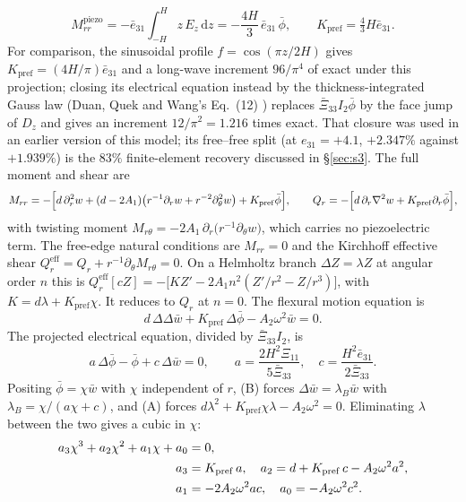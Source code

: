 \documentclass[11pt]{article}
\newcommand{\eebar}{\bar{e}_{31}}
\newcommand{\Xibar}{\bar{\Xi}_{33}}
\begin{document}
\begin{equation}
M_{rr}^{\mathrm{piezo}}=-\eebar\!\int_{-H}^{H}\!z\,E_z\,\mathrm dz
=-\frac{4H}{3}\,\eebar\,\bar\phi,\qquad
K_{\mathrm{pref}}=\tfrac43H\eebar.
\end{equation}
For comparison, the sinusoidal profile $f=\cos(\pi z/2H)$ gives
$K_{\mathrm{pref}}=(4H/\pi)\eebar$ and a long-wave increment $96/\pi^4$ of
exact under this projection; closing its electrical equation instead by
the thickness-integrated Gauss law (Duan, Quek and Wang's Eq.~(12)
\cite{duan2005}) replaces $\Xibar I_2\bar\phi$ by the face jump of
$D_z$ and gives an increment $12/\pi^2=1.216$ times exact. That closure
was used in an earlier version of this model; its free--free split
(at $e_{31}=+4.1$, $+2.347\%$ against $+1.939\%$) is the $83\%$
finite-element recovery discussed in \S\ref{sec:s3}. The full moment and shear are
\begin{equation}
M_{rr}=-\Bigl[d\,\partial_r^2 w+(d-2A_1)\bigl(r^{-1}\partial_r w
+r^{-2}\partial_\theta^2 w\bigr)+K_{\mathrm{pref}}\bar\phi\Bigr],\qquad
Q_r=-\Bigl[d\,\partial_r\nabla^2 w+K_{\mathrm{pref}}\partial_r\bar\phi\Bigr],
\end{equation}
with twisting moment $M_{r\theta}=-2A_1\,\partial_r\bigl(r^{-1}\partial_\theta w\bigr)$,
which carries no piezoelectric term. The free-edge natural conditions are
$M_{rr}=0$ and the Kirchhoff effective shear
$Q_r^{\mathrm{eff}}=Q_r+r^{-1}\partial_\theta M_{r\theta}=0$. On a Helmholtz branch
$\Delta Z=\lambda Z$ at angular order $n$ this is
$Q_r^{\mathrm{eff}}[cZ]=-\bigl[KZ'-2A_1n^2(Z'/r^2-Z/r^3)\bigr]$, with
$K=d\lambda+K_{\mathrm{pref}}\chi$. It reduces to $Q_r$ at $n=0$.
The flexural motion equation is
\begin{equation}
d\,\Delta\Delta\bar w+K_{\mathrm{pref}}\,\Delta\bar\phi
-A_2\omega^2\bar w=0. \tag{A}
\end{equation}
The projected electrical equation, divided by $\Xibar I_2$, is
\begin{equation}
a\,\Delta\bar\phi-\bar\phi+c\,\Delta\bar w=0,\qquad
a=\frac{2H^2\Xi_{11}}{5\Xibar},\quad c=\frac{H^2\eebar}{2\Xibar}. \tag{B}
\end{equation}
Positing $\bar\phi=\chi\bar w$ with $\chi$ independent of $r$, (B) forces
$\Delta\bar w=\lambda_B\bar w$ with $\lambda_B=\chi/(a\chi+c)$, and (A)
forces $d\lambda^2+K_{\mathrm{pref}}\chi\lambda-A_2\omega^2=0$.
Eliminating $\lambda$ between the two gives a cubic in $\chi$:
\begin{align}
a_3\chi^3+a_2\chi^2+a_1\chi+a_0&=0,\notag\\
a_3&=K_{\mathrm{pref}}\,a,\quad
a_2=d+K_{\mathrm{pref}}\,c-A_2\omega^2a^2,\notag\\
a_1&=-2A_2\omega^2ac,\quad
a_0=-A_2\omega^2c^2. \label{eq:cubic}
\end{align}
\end{document}
